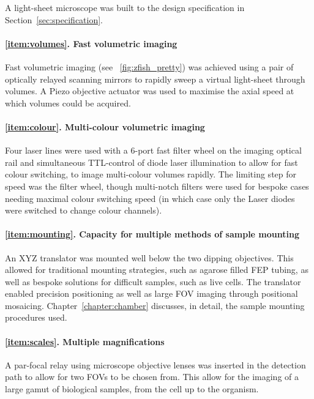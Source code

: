 A \gls{light-sheet} microscope was built to the design specification in Section~\ref{sec:specification}.

\paragraph{\ref{item:volumes}. Fast volumetric imaging}
Fast volumetric imaging (see \figurename~\ref{fig:zfish_pretty}) was achieved using a pair of optically relayed scanning mirrors to rapidly sweep a virtual light-sheet through volumes.
A Piezo objective actuator was used to maximise the axial speed at which volumes could be acquired.

\paragraph{\ref{item:colour}. Multi-colour volumetric imaging}
Four laser lines were used with a 6-port fast filter wheel on the \gls{imaging optical rail} and
simultaneous \gls{TTL}-control of diode laser illumination
to allow for fast colour switching, to image multi-colour volumes rapidly.
The limiting step for speed was the filter wheel, though multi-notch filters were used for bespoke cases needing maximal colour switching speed (in which case only the \gls{Laser} diodes were switched to change colour channels).%

\paragraph{\ref{item:mounting}. Capacity for multiple methods of sample mounting}
An XYZ translator was mounted well below the two dipping objectives.
This allowed for traditional mounting strategies, such as agarose filled \gls{FEP} tubing, as well as bespoke solutions for difficult samples, such as live cells.
The translator enabled precision positioning as well as large FOV imaging through positional mosaicing.
Chapter~\ref{chapter:chamber} discusses, in detail, the sample mounting procedures used.

\paragraph{\ref{item:scales}. Multiple magnifications}
A par-focal relay using microscope objective lenses was inserted in the detection path to allow for two FOVs to be chosen from. This allow for the imaging of a large gamut of biological samples, from the cell up to the organism.

